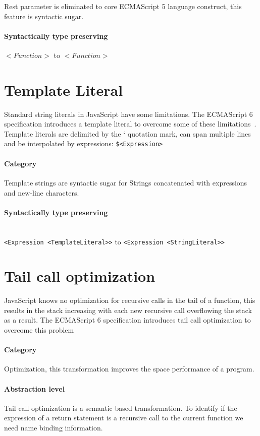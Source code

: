 Rest parameter is eliminated to core ECMAScript 5 language construct, this feature is syntactic sugar.

\paragraph{Syntactically type preserving}
$<Function>$ to $<Function>$

\section{Template Literal}
Standard string literals in JavaScript have some limitations. The ECMAScript 6 specification introduces a template literal to overcome some of these limitations~\cite[12.2.8]{SpecJS}. Template literals are delimited by the ` quotation mark, can span multiple lines and be interpolated by expressions: \lstinline{$<Expression>}

\paragraph{Category}
Template strings are syntactic sugar for Strings concatenated with expressions and new-line characters.

\paragraph{Syntactically type preserving} \mbox{}\\
\lstinline$<Expression <TemplateLiteral>>$ to \lstinline$<Expression <StringLiteral>>$

\section{Tail call optimization} \label{tail-call-optimization}
JavaScript knows no optimization for recursive calls in the tail of a function, this results in the stack increasing with each new recursive call overflowing the stack as a result.  The ECMAScript 6 specification introduces tail call optimization to overcome this problem~\cite[14.6]{SpecJS}

\paragraph{Category}
Optimization, this transformation improves the space performance of a program.

\paragraph{Abstraction level}
Tail call optimization is a semantic based transformation. To identify if the expression of a return statement is a recursive call to the current function we need name binding information.

